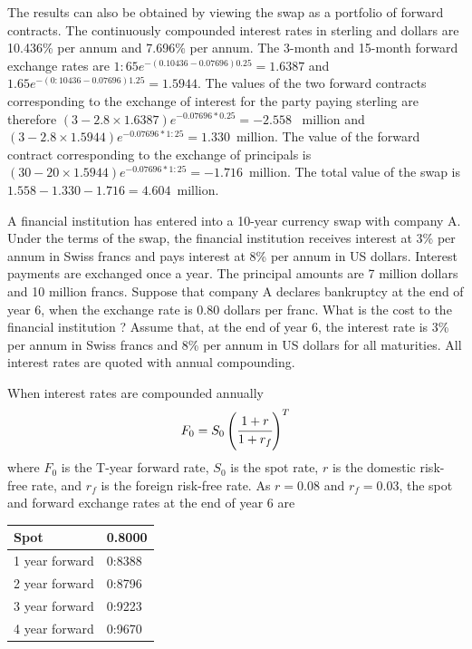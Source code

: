 \documentclass[12pt,a4paper]{exam}
\begin{document}
\begin{questions}
\begin{solution}
\begin{solution}
The results can also be obtained by viewing the swap as a portfolio of forward contracts. The continuously compounded interest rates in sterling and dollars are 10.436\% per annum and 7.696\% per annum. The 3-month and 15-month forward exchange rates are
$1:65e^{-(0.10436-0.07696)0.25}= 1.6387$ and $1.65e^{-(0:10436-0.07696)1.25} = 1.5944$.
The values of the two forward contracts corresponding to the exchange of interest for the party paying sterling are therefore
$(3-2.8\times  1.6387) e^{-0.07696*0.25} = -2.558$~ million
and $(3- 2.8\times  1.5944) e^{-0.07696*1:25} = 1.330$~million.
The value of the forward contract corresponding to the exchange of principals is $(30-20\times 1.5944) e^{-0.07696*1:25} = -1.716$~million.
The total value of the swap is $1.558-1.330-1.716 = 4.604$~million.
\end{solution}

\question A financial institution has entered into a 10-year currency swap with company A.
Under the terms of the swap, the financial institution receives interest at 3\% per annum in Swiss francs and pays interest at 8\% per annum in US dollars. Interest payments are exchanged once a year. The principal amounts are 7 million dollars and 10 million
francs. Suppose that company A declares bankruptcy at the end of year 6, when the exchange rate is 0.80 dollars per franc. What is the cost to the financial institution ? Assume that, at the end of year 6, the interest rate is 3\% per annum in Swiss francs and 8\%
per annum in US dollars for all maturities. All interest rates are quoted with annual compounding.

\begin{solution}
When interest rates are compounded annually
\begin{equation*}
	F_0 = S_0\left(\cfrac{1+r}{1+r_f}\right)^T
\end{equation*}
where $F_0$ is the T-year forward rate, $S_0$ is the spot rate, $r$ is the domestic risk-free rate, and $r_f$ is the foreign risk-free rate. As $r = 0.08$ and $r_f = 0.03$, the spot and forward
exchange rates at the end of year 6 are

\begin{center}
	\begin{tabular}{|l|l|}
		Spot & 0.8000 \\ \hline
1 year forward & 0:8388 \\ \hline
2 year forward & 0:8796 \\ \hline
3 year forward & 0:9223 \\ \hline
4 year forward & 0:9670 \\ \hline
	\end{tabular}
\end{center}


\end{solution}
\end{solution}
\end{questions}
\end{document}
